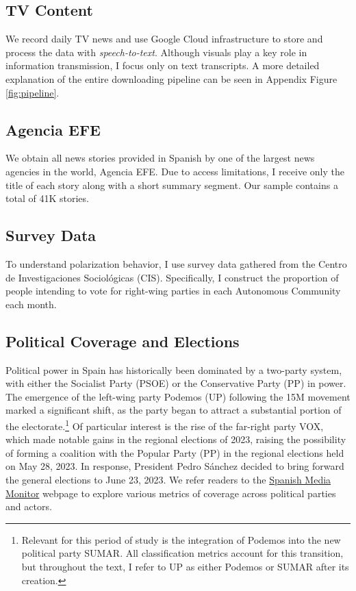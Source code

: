 \documentclass[12pt]{article}
\begin{document}
	
	
	\subsection*{TV Content}
	
	We record daily TV news and use Google Cloud infrastructure to store and process the data with \textit{speech-to-text}. Although visuals play a key role in information transmission, I focus only on text transcripts. A more detailed explanation of the entire downloading pipeline can be seen in Appendix Figure \ref{fig:pipeline}.
	
	
	\subsection*{Agencia EFE}
	
	We obtain all news stories provided in Spanish by one of the largest news agencies in the world, Agencia EFE. Due to access limitations, I receive only the title of each story along with a short summary segment. Our sample contains a total of 41K stories.
	
	\subsection*{Survey Data}
	
	To understand polarization behavior, I use survey data gathered from the Centro de Investigaciones Sociológicas (CIS). Specifically, I construct the proportion of people intending to vote for right-wing parties in each Autonomous Community each month.
	
	\subsection{Political Coverage and Elections}
	
	Political power in Spain has historically been dominated by a two-party system, with either the Socialist Party (PSOE) or the Conservative Party (PP) in power. The emergence of the left-wing party Podemos (UP) following the 15M movement marked a significant shift, as the party began to attract a substantial portion of the electorate.\footnote{Relevant for this period of study is the integration of Podemos into the new political party SUMAR. All classification metrics account for this transition, but throughout the text, I refer to UP as either Podemos or SUMAR after its creation.} Of particular interest is the rise of the far-right party VOX, which made notable gains in the regional elections of 2023, raising the possibility of forming a coalition with the Popular Party (PP) in the regional elections held on May 28, 2023. In response, President Pedro Sánchez decided to bring forward the general elections to June 23, 2023. We refer readers to the \href{https://luisignaciomenendez.github.io/media_monitor/index.html}{Spanish Media Monitor} webpage to explore various metrics of coverage across political parties and actors.
	
\end{document}
